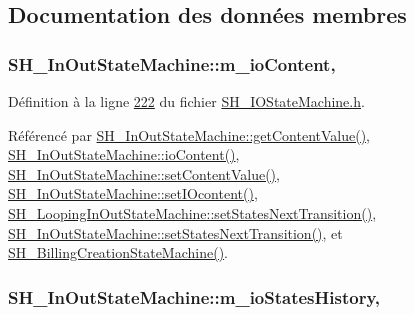 \subsection{Documentation des données membres}
\hypertarget{classSH__InOutStateMachine_a8cfbc27eef057bf37b7711bdfef2077e}{
\subsubsection[{m\-\_\-io\-Content}]{\setlength{\rightskip}{0pt plus 5cm}S\-H\-\_\-\-In\-Out\-State\-Machine\-::m\-\_\-io\-Content\hspace{0.3cm}{\ttfamily [protected]}, {\ttfamily [inherited]}}}\label{classSH__InOutStateMachine_a8cfbc27eef057bf37b7711bdfef2077e}


Définition à la ligne \hyperlink{SH__IOStateMachine_8h_source_l00222}{222} du fichier \hyperlink{SH__IOStateMachine_8h_source}{S\-H\-\_\-\-I\-O\-State\-Machine.\-h}.



Référencé par \hyperlink{classSH__InOutStateMachine_aa1a3bd3c0ea8a59b9bc916dc718eb9ca}{S\-H\-\_\-\-In\-Out\-State\-Machine\-::get\-Content\-Value()}, \hyperlink{classSH__InOutStateMachine_aaca105fbd5f5cc3bac115389ad3694c5}{S\-H\-\_\-\-In\-Out\-State\-Machine\-::io\-Content()}, \hyperlink{classSH__InOutStateMachine_a9ab1534306b2bdb62743d4bcefe40c17}{S\-H\-\_\-\-In\-Out\-State\-Machine\-::set\-Content\-Value()}, \hyperlink{classSH__InOutStateMachine_a8271a7ec7d5f6502449dd3b4da5f4155}{S\-H\-\_\-\-In\-Out\-State\-Machine\-::set\-I\-Ocontent()}, \hyperlink{classSH__LoopingInOutStateMachine_a0ee122553641721012f3710e71cce234}{S\-H\-\_\-\-Looping\-In\-Out\-State\-Machine\-::set\-States\-Next\-Transition()}, \hyperlink{classSH__InOutStateMachine_a70d6d81c0a8d4afd6aab0a7239edc237}{S\-H\-\_\-\-In\-Out\-State\-Machine\-::set\-States\-Next\-Transition()}, et \hyperlink{classSH__BillingCreationStateMachine_ad62b77fa4aeafe200056ff3974562f83}{S\-H\-\_\-\-Billing\-Creation\-State\-Machine()}.

\hypertarget{classSH__InOutStateMachine_ac46ad1af230e1b2156d805275690dec3}{
\subsubsection[{m\-\_\-io\-States\-History}]{\setlength{\rightskip}{0pt plus 5cm}S\-H\-\_\-\-In\-Out\-State\-Machine\-::m\-\_\-io\-States\-History\hspace{0.3cm}{\ttfamily [protected]}, {\ttfamily [inherited]}}}\label{classSH__InOutStateMachine_ac46ad1af230e1b2156d805275690dec3}


